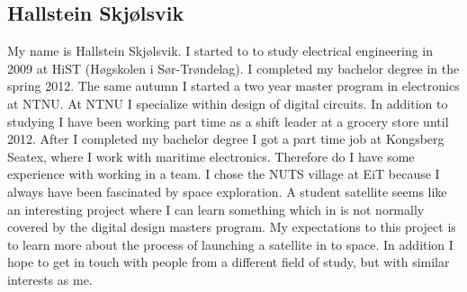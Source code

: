 \subsection{Hallstein Skjølsvik}
My name is Hallstein Skjølsvik. I started to to study electrical engineering in 2009 at HiST (Høgskolen i Sør-Trøndelag). I completed my bachelor degree in the spring 2012. The same autumn I started a two year master program in electronics at NTNU. At NTNU I specialize within design of digital circuits. In addition to studying I have been working part time as a shift leader at a grocery store until 2012. After I completed my bachelor degree I got a part time job at Kongsberg Seatex, where I work with maritime electronics. Therefore do I have some experience with working in a team. 
	I chose the NUTS village at EiT because I always have been fascinated by space exploration. A student satellite seems like an interesting project where I can learn something which in is not normally covered by the digital design masters program. My expectations to this project is to learn more about the process of launching a satellite in to space. In addition I hope to get in touch with people from a different field of study, but with similar interests as me.